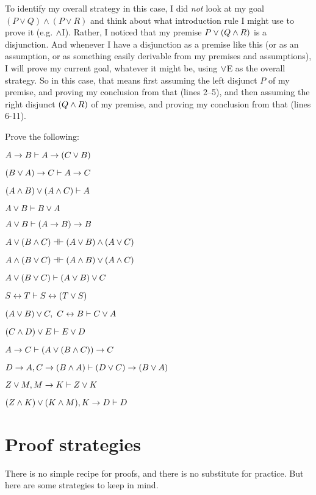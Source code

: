 To identify my overall strategy in this case, I did \emph{not} look at my goal $(P\lor Q)\land (P\lor R)$ and think about what introduction rule I might use to prove it (e.g. $\wedge$I).  Rather, I noticed that my premise $P \vee (Q \wedge R)$ is a disjunction.  And whenever I have a disjunction as a premise like this (or as an assumption, or as something easily derivable from my premises and assumptions), I will prove my current goal, whatever it might be, using $\vee$E as the overall strategy. So in this case, that means first assuming the left disjunct $P$ of my premise, and proving my conclusion from that (lines 2--5), and then assuming the right disjunct $(Q \wedge R)$ of my premise, and proving my conclusion from that (lines 6-11).



\practiceproblems

\problempart
Prove the following:

\begin{earg}
\item $A \rightarrow B \vdash A \rightarrow (C \vee B)$
\item $(B \vee A) \rightarrow C \vdash A \rightarrow C$
\item $(A \wedge B) \vee (A \wedge C) \vdash A$
\item $A \vee B \vdash B \vee A$
\item  $A \vee B \vdash (A\rightarrow B) \rightarrow B$ 
\item $A \eor (B \eand C) \pequiv (A \eor B) \eand (A \eor C)$
\item $ A \eand (B \eor C) \pequiv (A \eand B) \eor (A \eand C)$
\item $A \vee (B \vee C) \vdash (A \vee B) \vee C$
\item $S\leftrightarrow T \vdash S\leftrightarrow (T\vee S)$
\item $(A \vee B) \vee C, \ C \leftrightarrow B \vdash C \vee A$
\item $(C\wedge D)\vee E \vdash E\vee D$
\item $A \rightarrow  C \vdash (A \vee (B \wedge C)) \rightarrow C$ 
\item $D \rightarrow A, C \rightarrow (B \wedge A) \vdash (D \vee C) \rightarrow (B \vee A)$
\item $Z \lor M, M \rightarrow K \vdash  Z \lor K $
\item $(Z\wedge K) \vee (K\wedge M), K \rightarrow D \vdash D$
\end{earg}



\section{Proof strategies}\label{s:ProofStrategies}
There is no simple recipe for proofs, and there is no substitute for practice. But here are some strategies to keep in mind.

